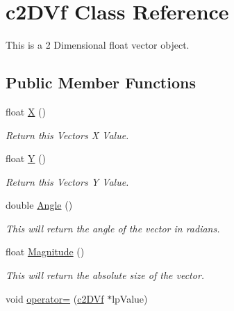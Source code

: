 \hypertarget{classc2_d_vf}{
\section{c2DVf Class Reference}
\label{classc2_d_vf}
}


This is a 2 Dimensional float vector object.  


\subsection*{Public Member Functions}
\begin{DoxyCompactItemize}
\item 
\hypertarget{classc2_d_vf_abba8d258fe9507867ae2f0ae66eb9a2f}{
float \hyperlink{classc2_d_vf_abba8d258fe9507867ae2f0ae66eb9a2f}{X} ()}
\label{classc2_d_vf_abba8d258fe9507867ae2f0ae66eb9a2f}

\begin{DoxyCompactList}\small\item\em Return this Vectors X Value. \end{DoxyCompactList}\item 
\hypertarget{classc2_d_vf_af0d78584dfe93be4506a60562da9564b}{
float \hyperlink{classc2_d_vf_af0d78584dfe93be4506a60562da9564b}{Y} ()}
\label{classc2_d_vf_af0d78584dfe93be4506a60562da9564b}

\begin{DoxyCompactList}\small\item\em Return this Vectors Y Value. \end{DoxyCompactList}\item 
\hypertarget{classc2_d_vf_af27fa9c4e23dc40f387de099d95c20e6}{
double \hyperlink{classc2_d_vf_af27fa9c4e23dc40f387de099d95c20e6}{Angle} ()}
\label{classc2_d_vf_af27fa9c4e23dc40f387de099d95c20e6}

\begin{DoxyCompactList}\small\item\em This will return the angle of the vector in radians. \end{DoxyCompactList}\item 
\hypertarget{classc2_d_vf_a86cc6b98f659391c7d7f9ca3b4fa67b0}{
float \hyperlink{classc2_d_vf_a86cc6b98f659391c7d7f9ca3b4fa67b0}{Magnitude} ()}
\label{classc2_d_vf_a86cc6b98f659391c7d7f9ca3b4fa67b0}

\begin{DoxyCompactList}\small\item\em This will return the absolute size of the vector. \end{DoxyCompactList}\item 
\hypertarget{classc2_d_vf_ad3ad8262ba3a4a079459a9830ef13dd0}{
void \hyperlink{classc2_d_vf_ad3ad8262ba3a4a079459a9830ef13dd0}{operator=} (\hyperlink{classc2_d_vf}{c2DVf} $\ast$lpValue)}
\label{classc2_d_vf_ad3ad8262ba3a4a079459a9830ef13dd0}


\end{DoxyCompactItemize}
